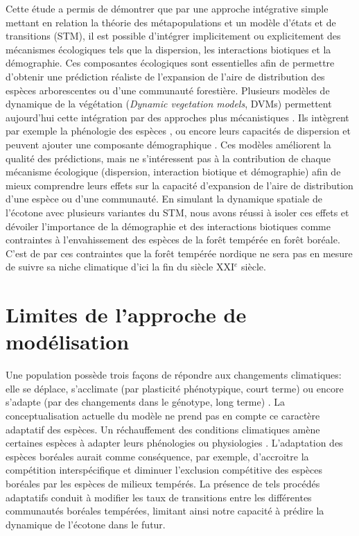 
Cette étude a permis de démontrer que par une approche intégrative simple mettant en relation la
théorie des métapopulations et un modèle d'états et de transitions (STM), il est possible d'intégrer
implicitement ou explicitement des mécanismes écologiques tels que la dispersion, les interactions
biotiques et la démographie. Ces composantes écologiques sont essentielles afin de permettre
d'obtenir une prédiction réaliste de l'expansion de l'aire de distribution des espèces arborescentes
ou d'une communauté forestière. Plusieurs modèles de dynamique de la végétation (\textit{Dynamic
vegetation models}, DVMs) permettent aujourd'hui cette intégration par des approches plus
mécanistiques \citep{Snell2014a}. Ils intègrent par exemple la phénologie des espèces
\citep{Letters2001,Morin2008}, ou encore leurs capacités de dispersion \citep{Nobis2014,Iverson2004}
et peuvent ajouter une composante démographique \citep{Lischke2006a,Vanderwel2014}. Ces modèles
améliorent la qualité des prédictions, mais ne s'intéressent pas à la contribution de chaque
mécanisme écologique (dispersion, interaction biotique et démographie) afin de mieux comprendre
leurs effets sur la capacité d'expansion de l'aire de distribution d'une espèce ou d'une
communauté. En simulant la dynamique spatiale de l'écotone avec plusieurs variantes du STM, nous
avons réussi à isoler ces effets et dévoiler l'importance de la démographie et des interactions
biotiques comme contraintes à l'envahissement des espèces de la forêt tempérée en forêt boréale.
C'est de par ces contraintes que la forêt tempérée nordique ne sera pas en mesure de suivre sa
niche climatique d'ici la fin du siècle XXI$^e$ siècle.

\section*{Limites de l'approche de modélisation}

Une population possède trois façons de répondre aux  changements climatiques: elle se déplace,
s'acclimate (par plasticité phénotypique, court terme) ou encore s'adapte (par des changements dans
le génotype, long terme) \citep{Corlett2013}. La conceptualisation actuelle du modèle ne prend pas
en compte ce caractère adaptatif des espèces. Un réchauffement des conditions climatiques amène
certaines espèces à adapter leurs phénologies ou physiologies \citep{Saxe2001,Davis2001}.
L'adaptation des espèces boréales aurait comme conséquence, par exemple, d'accroitre la compétition
interspécifique et diminuer l'exclusion compétitive des espèces boréales par les espèces de milieux
tempérés. La présence de tels procédés adaptatifs conduit à modifier les taux de transitions entre
les différentes communautés boréales tempérées, limitant ainsi notre capacité à prédire la dynamique
de l'écotone dans le futur.

